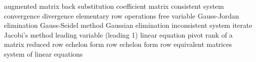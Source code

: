 augmented matrix
back substitution
coefficient matrix
consistent system
convergence
divergence
elementary row operations
free variable
Gauss-Jordan elimination
Gauss-Seidel method
Gaussian elimination
inconsistent system
iterate
Jacobi's method
leading variable (leading 1)
linear equation
pivot
rank of a matrix
reduced row echelon form
row echelon form
row equivalent matrices
system of linear equations





















